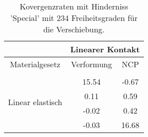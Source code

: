 \begin{table} 
\centering 
\begin{tabular}{c|cc|} 
\cline{2-3} 
 & \multicolumn{2}{|c|}{Linearer Kontakt} \\ 
\hline 
\multicolumn{1}{|c|}{Materialgesetz} & \multicolumn{1}{c|}{Verformung} & \multicolumn{1}{c|}{NCP} \\ 
\hline 
\multicolumn{1}{|c|}{\multirow{5}{*}{Linear elastisch}} &\multicolumn{1}{|c|}{} & \multicolumn{1}{|c|}{} \\ 
\multicolumn{1}{|c|}{} & \multicolumn{1}{|c|}{     15.54} & \multicolumn{1}{|c|}{     -0.67} \\ 
\multicolumn{1}{|c|}{} & \multicolumn{1}{|c|}{      0.11} & \multicolumn{1}{|c|}{      0.59} \\ 
\multicolumn{1}{|c|}{} & \multicolumn{1}{|c|}{     -0.02} & \multicolumn{1}{|c|}{      0.42} \\ 
\multicolumn{1}{|c|}{} & \multicolumn{1}{|c|}{     -0.03} & \multicolumn{1}{|c|}{     16.68} \\ 
\hline 
\end{tabular}\caption{Kovergenzraten mit Hinderniss 'Special' mit 234 Freiheitsgraden für die Verschiebung.}\label{tab:Rate_Special_level2}
\end{table} 
